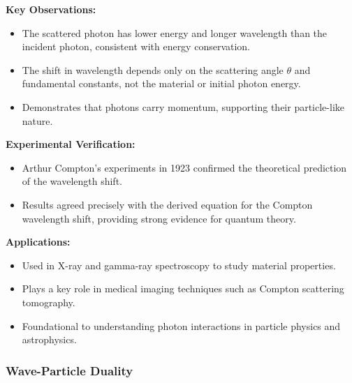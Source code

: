 \documentclass{article}
\newcommand{\conceptbox}[1]{\begin{tcolorbox}[colback=blue!10] #1 \end{tcolorbox}}
\begin{document}
\conceptbox{
\textbf{Key Observations:}
\begin{itemize}
    \item The scattered photon has lower energy and longer wavelength than the incident photon, consistent with energy conservation.
    \item The shift in wavelength depends only on the scattering angle \( \theta \) and fundamental constants, not the material or initial photon energy.
    \item Demonstrates that photons carry momentum, supporting their particle-like nature.
\end{itemize}
}

\conceptbox{
\textbf{Experimental Verification:}
\begin{itemize}
    \item Arthur Compton's experiments in 1923 confirmed the theoretical prediction of the wavelength shift.
    \item Results agreed precisely with the derived equation for the Compton wavelength shift, providing strong evidence for quantum theory.
\end{itemize}
}

\conceptbox{
\textbf{Applications:}
\begin{itemize}
    \item Used in X-ray and gamma-ray spectroscopy to study material properties.
    \item Plays a key role in medical imaging techniques such as Compton scattering tomography.
    \item Foundational to understanding photon interactions in particle physics and astrophysics.
\end{itemize}
}

\newpage
\subsubsection{Wave-Particle Duality}
\end{document}
